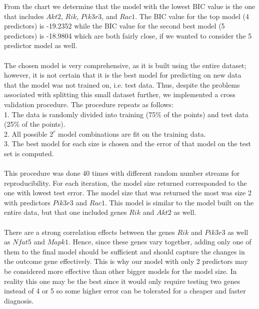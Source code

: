 \documentclass{article}
\begin{document}
From the chart we determine that the model with the lowest BIC value is the one that includes $Akt2$, $Rik$, $Pik3r3$, and $Rac1$.  The BIC value for the top model (4 predictors) is  -19.2352 while the BIC value for the second best model (5 predictors) is -18.9804 which are both fairly close, if we wanted to consider the 5 predictor model as well.\\
\null\\
The chosen model is very comprehensive, as it is built using the entire dataset; however, it is not certain that it is the best model for predicting on new data that the model was not trained on, i.e. test data.  Thus, despite the problems associated with splitting this small dataset further, we implemented a cross validation procedure. The procedure repeats as follows:\\
1. The data is randomly divided into training (75\% of the points) and test data (25\% of the points).\\
2. All possible $2^r$ model combinations are fit on the training data.\\
3. The best model for each size is chosen and the error of that model on the test set is computed. \\
\null\\
This procedure was done 40 times with different random number streams for reproducibility.  For each iteration, the model size returned corresponded to the one with lowest test error.  The model size that was returned the most was size 2 with predictors $Pik3r3$ and $Rac1$. This model is similar to the model built on the entire data, but that one included genes $Rik$ and $Akt2$ as well.\\
\null\\
There are a strong correlation effects between the genes $Rik$ and $Pik3r3$ as well as $Nfat5$ and $Mapk1$. Hence, since these genes vary together, adding only one of them to the final model should be sufficient and should capture the changes in the outcome gene effectively. This is why our model with only 2 predictors may be considered more effective than other bigger models for the model size.  In reality this one may be the best since it would only require testing two genes instead of 4 or 5 so some higher error can be tolerated for a cheaper and faster diagnosis.
%
\end{document}
